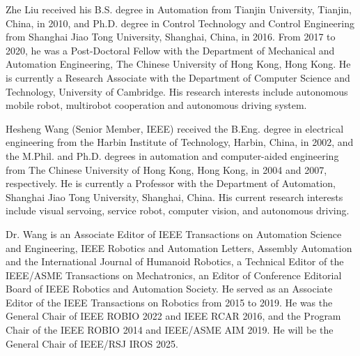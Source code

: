 \documentclass[journal]{IEEEtran}
\begin{document}
\begin{IEEEbiography}{Zhe Liu} received his B.S. degree in Automation from Tianjin University, Tianjin, China, in 2010, and Ph.D. degree in Control Technology and Control Engineering from Shanghai Jiao Tong University, Shanghai, China, in 2016. From 2017 to 2020, he was a Post-Doctoral Fellow with the Department of Mechanical and Automation Engineering, The Chinese University of Hong Kong, Hong Kong. He is currently a Research Associate with the Department of Computer Science and Technology, University of Cambridge. His research interests include autonomous mobile robot, multirobot cooperation and autonomous driving system. 
\end{IEEEbiography}
\begin{IEEEbiography}{Hesheng Wang}
 (Senior Member, IEEE) received the B.Eng. degree in electrical engineering from the Harbin Institute of Technology, Harbin, China, in 2002, and the M.Phil. and Ph.D. degrees in automation and computer-aided engineering from The Chinese University of Hong Kong, Hong Kong, in 2004 and 2007, respectively. He is currently a Professor with the Department of Automation, Shanghai Jiao Tong University, Shanghai, China. His current research interests include visual servoing, service robot, computer vision, and autonomous driving. 

Dr. Wang is an Associate Editor of IEEE Transactions on Automation Science and Engineering, IEEE Robotics and Automation Letters, Assembly Automation and the International Journal of Humanoid Robotics, a Technical Editor of the IEEE/ASME Transactions on Mechatronics, an Editor of Conference Editorial Board of IEEE Robotics and Automation Society. He served as an Associate Editor of the IEEE Transactions on Robotics from 2015 to 2019. He was the General Chair of IEEE ROBIO 2022 and IEEE RCAR 2016, and the Program Chair of the IEEE ROBIO 2014 and IEEE/ASME AIM 2019. He will be the General Chair of IEEE/RSJ IROS 2025. 
\end{IEEEbiography}
\end{document}
